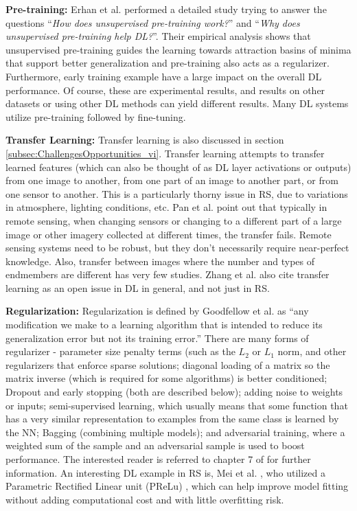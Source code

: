 \documentclass[12pt]{spieman}
\begin{document}
\begin{spacing}{1}
\textbf{Pre-training:} Erhan et al. \cite{Erhan2010} performed a detailed study trying to answer the questions ``\textit{How does unsupervised pre-training work?}'' and ``\textit{Why does unsupervised pre-training help DL?}''. Their empirical analysis shows that unsupervised pre-training guides the learning towards attraction basins of minima that support better generalization and pre-training also acts as a regularizer. Furthermore, early training example have a large impact on the overall DL performance. Of course, these are experimental results, and results on other datasets or using other DL methods can yield different results. Many DL systems utilize pre-training followed by fine-tuning.

\textbf{Transfer Learning:} Transfer learning is also discussed in section \ref{subsec:ChallengesOpportunities_vi}. Transfer learning attempts to transfer learned features (which can also be thought of as DL layer activations or outputs) from one image to another, from one part of an image to another part, or from one sensor to another. This is a particularly thorny issue in RS, due to variations in atmosphere, lighting conditions, etc. Pan et al. \cite{pan2010survey} point out that typically in remote sensing, when changing sensors or changing to a different part of a large image or other imagery collected at different times, the transfer fails. Remote sensing systems need to be robust, but they don't necessarily require near-perfect knowledge. Also, transfer between images where the number and types of endmembers are different has very few studies. Zhang et al. \cite{Zhang2016} also cite transfer learning as an open issue in DL in general, and not just in RS.

\textbf{Regularization:} Regularization is defined by Goodfellow et al. \cite{goodfellow2016deep} as ``any modification we make to a learning algorithm that is intended to reduce its generalization error but not its training error.'' There are many forms of regularizer - parameter size penalty terms (such as the $L_{2}$ or $L_{1}$ norm, and other regularizers that enforce sparse solutions; diagonal loading of a matrix so the matrix inverse (which is required for some algorithms) is better conditioned; Dropout and early stopping (both are described below); adding noise to weights or inputs; semi-supervised learning, which usually means that some function that has a very similar representation to examples from the same class is learned by the NN; Bagging (combining multiple models); and adversarial training, where a weighted sum of the sample and an adversarial sample is used to boost performance. The interested reader is referred to chapter 7 of \cite{goodfellow2016deep} for further information. An interesting DL example in RS is, Mei et al. \cite{Mei2016Integrating} , who utilized a Parametric Rectified Linear unit (PReLu) \cite{he2015delving} , which can help improve model fitting without adding computational cost and with little overfitting risk.


\end{spacing}
\end{document}
